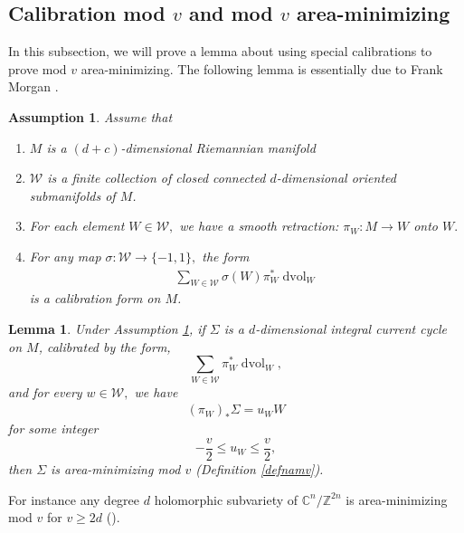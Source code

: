 \documentclass[11pt,a4paper]{amsart}
\numberwithin{equation}{section}
\newcommand{\si}{\sigma}
\newcommand{\Si}{\Sigma}
\newcommand{\dvol}{\operatorname{dvol}}
\newcommand{\du}{^\ast}
\newcommand{\pf}{_\ast}
\newcommand{\Z}{\mathbb{Z}}
\newcommand{\C}{\mathbb{C}}
\theoremstyle{plain}
\newtheorem{lem}[exam]{Lemma}
\newtheorem{assump}[exam]{Assumption}
\theoremstyle{definition}
\numberwithin{equation}{subsection}
\begin{document}
\subsection{Calibration mod $v$ and mod $v$ area-minimizing}\label{seccalv}
In this subsection, we will prove a lemma about using special calibrations to prove mod $v$ area-minimizing. The following lemma is essentially due to Frank Morgan \cite{FMcalv}.
\begin{assump}\label{assumpv}Assume that
	\begin{enumerate}		
		\item  $M$ is a $(d+c)$-dimensional Riemannian manifold
		\item  $\mathcal{W}$ is a finite collection of closed connected $d$-dimensional oriented submanifolds of $M$.
		\item  For each element $W\in\mathcal{W},$ we have a smooth retraction: $\pi_W:M\to W$ onto $W.$
		\item \label{sigsum} For any map $\si:\mathcal{W}\to\{-1,1\},$ the form
		\begin{align*}
			\sum_{W\in\mathcal{W}}\si(W)\pi_W\du\dvol_W
		\end{align*}is a calibration form on $M$.
	\end{enumerate}
\end{assump}
\begin{lem}\label{lemcalv}Under Assumption \ref{assumpv}, if
$\Si$ is a $d$-dimensional integral current cycle on $M$, calibrated by the form, $$\sum_{W\in\mathcal{W}}\pi\du_W\dvol_W,$$
and for every $w\in \mathcal{W},$ we have
\begin{align*}
	(\pi_W)\pf \Si=u_WW
\end{align*}for some integer $$-\frac{v}{2}\le u_W\le \frac{v}{2},$$
then $\Si$ is area-minimizing mod $v$ (Definition \ref{defnamv}).
\end{lem}
For instance any degree $d$ holomorphic subvariety of $\C^n/\Z^{2n}$ is area-minimizing mod $v$ for $v\ge 2d$ (\cite{FMcalv}).
\end{document}
